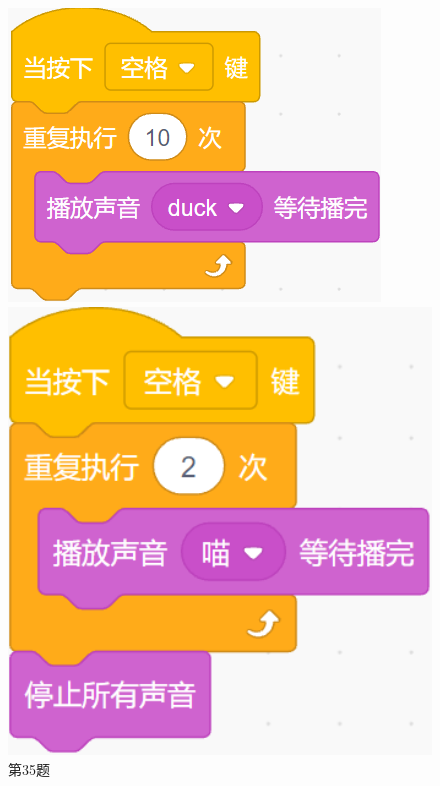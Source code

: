 \documentclass[10pt, a4paper]{article}
\begin{document}
\begin{enumerate}
\begin{figure}[htbp]
\begin{minipage}[t]{.25\textwidth}
            \end{minipage}
            \begin{minipage}[t]{.19\textwidth}
                \centering
                \includegraphics[width=\textwidth]{35-3.png}
            \end{minipage}
            \begin{minipage}[t]{.15\textwidth}
                \centering
                \includegraphics[width=1\textwidth]{35-4.png}
            \end{minipage}
            \caption*{第35题}
        \end{figure}
    \end{enumerate}
\end{document}
